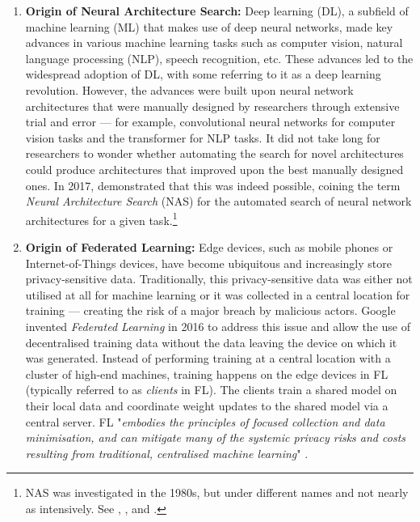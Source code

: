 \begin{enumerate}
    \item \textbf{Origin of Neural Architecture Search:} Deep learning (DL), a subfield of machine learning (ML) that makes use of deep neural networks, made key advances in various machine learning tasks such as computer vision, natural language processing (NLP), speech recognition, etc. These advances led to the widespread adoption of DL, with some referring to it as a deep learning revolution. However, the advances were built upon neural network architectures that were manually designed by researchers through extensive trial and error — for example, convolutional neural networks for computer vision tasks and the transformer for NLP tasks. It did not take long for researchers to wonder whether automating the search for novel architectures could produce architectures that improved upon the best manually designed ones. In 2017, \cite{nas_with_rl_2017} demonstrated that this was indeed possible, coining the term \textit{Neural Architecture Search} (NAS) for the automated search of neural network architectures for a given task.\footnote{NAS was investigated in the 1980s, but under different names and not nearly as intensively. See \cite{self_organizing_nn_1988}, \cite{genetic_algo_nas_1989}, \cite{desgning_nn_with_genetic_algo_1990} and \cite{evo_rnn_nas_1994}.}
    \item \textbf{Origin of Federated Learning:} Edge devices, such as mobile phones or Internet-of-Things devices, have become ubiquitous and increasingly store privacy-sensitive data. Traditionally, this privacy-sensitive data was either not utilised at all for machine learning or it was collected in a central location for training — creating the risk of a major breach by malicious actors. Google invented \textit{Federated Learning} in 2016 to address this issue and allow the use of decentralised training data without the data leaving the device on which it was generated. Instead of performing training at a central location with a cluster of high-end machines, training happens on the edge devices in FL (typically referred to as \textit{clients} in FL). The clients train a shared model on their local data and coordinate weight updates to the shared model via a central server. FL "\textit{embodies the principles of focused collection and data minimisation, and can mitigate many of the systemic privacy risks and costs resulting from traditional, centralised machine learning}" \cite{fl_advances_and_open_problems_2021}.
\end{enumerate}

